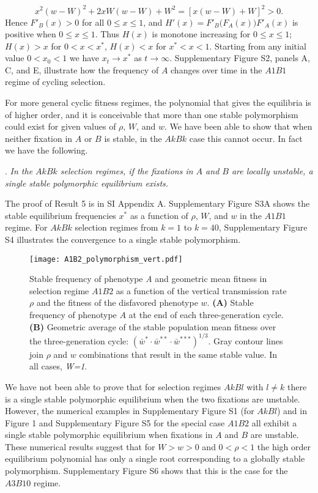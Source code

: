 \documentclass[9pt,twocolumn,twoside,lineno]{pnas-new}
\begin{document}
 \begin{equation}x^2\left(w-W\right)^2 +2xW(w-W) +W^2 =\left[x(w-W) +W\right]^2 >0.\label{27}\end{equation}
  Hence $F'_{B}(x)>0$ for all $0\le x\le 1$, and $H'(x) =F'_B\bigl(F_A(x)\bigr)F'_A(x)$ is positive when $0\le x\le 1$. Thus $H(x)$ is monotone increasing for $0\le x\le 1$; $H(x)>x$ for $0<x<x^*$, $H(x)<x$ for $x^*<x<1$.
Starting from any initial value $0<x_0 <1$ we have  $x_t\to x^*$ as $t\to\infty$. Supplementary Figure S2, panels A, C, and E, illustrate  how the frequency of $A$ changes over time in the $A1B1$ regime of cycling selection. 

For more general cyclic fitness regimes, the polynomial that gives the equilibria is of higher order, and it is conceivable that more than one stable polymorphism could exist for given values of $\rho$, $W$, and $w$. We have been able to show that when neither fixation in $A$ or $B$ is stable, in the $AkBk$ case this cannot occur. In fact we have the following.
\medskip

. {\sl In the $AkBk$ selection regimes, if the fixations in $A$ and $B$ are locally unstable, a single stable polymorphic equilibrium exists.}\par
\medskip

The proof of Result 5 is in SI Appendix A. Supplementary Figure S3A shows the stable equilibrium frequencies $x^*$ as a function of $\rho$, $W$, and $w$ in the $A1B1$ regime.
For $AkBk$ selection regimes from $k=1$ to $k=40$, Supplementary Figure S4 illustrates the convergence to a single stable polymorphism. 

\begin{figure}[h]
\centering
\texttt{[image: A1B2\_polymorphism\_vert.pdf]}
\caption{Stable frequency of phenotype \emph{A} and geometric mean fitness in selection regime
$A1B2$ as a function of the vertical transmission rate \(\rho\) and the fitness of the disfavored phenotype \(w\).
\textbf{(A)} Stable frequency of phenotype $A$ at the end of each three-generation cycle.
\textbf{(B)} Geometric average of the stable population mean fitness over the three-generation cycle: $(\bar{w}^* \cdot \bar{w}^{**} \cdot \bar{w}^{***})^{1/3}$.
Gray contour lines join \(\rho\) and \(w\) combinations that result in the same stable value.
In all cases, \emph{W=1}.}\label{fig:A1B2_polymorphism}
\end{figure}

We have not been able to prove that for selection regimes $AkBl$ with $l\ne k$ there is a single stable polymorphic equilibrium when the two fixations are unstable. However, the numerical examples in Supplementary Figure S1 (for $AkBl$) and in Figure 1 and Supplementary Figure S5 for the special case $A1B2$ all exhibit a single stable polymorphic equilibrium when fixations in $A$ and $B$ are unstable. These numerical results suggest that for $W>w>0$ and $0<\rho<1$ the high order equilibrium polynomial has only a single root corresponding to a globally stable polymorphism. Supplementary Figure S6 shows that this is the case for the $A3B10$ regime.
\end{document}
